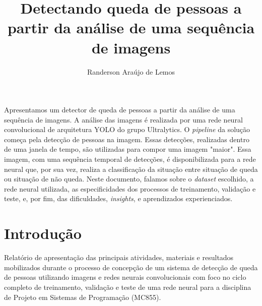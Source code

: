 \documentclass[12pt]{article}
\title{Detectando queda de pessoas a partir da análise de uma sequência de imagens}
\author{Randerson Araújo de Lemos\inst{1}}
\begin{document}
 

\maketitle 

     
\begin{resumo} 
  Apresentamos um detector de queda de pessoas a partir da análise de uma sequência de imagens. A análise das imagens é realizada por uma rede neural convolucional de arquitetura YOLO do grupo Ultralytics. O \textit{pipeline} da solução começa pela detecção de pessoas na imagem. Essas detecções, realizadas dentro de uma janela de tempo, são utilizadas para compor uma imagem "maior". Essa imagem, com uma sequência temporal de detecções, é disponibilizada para a rede neural que, por sua vez, realiza a classificação da situação entre situação de queda ou situação de não queda. Neste documento, falamos sobre o \textit{dataset} escolhido, a rede neural utilizada, as especificidades dos processos de treinamento, validação e teste, e, por fim, das dificuldades, \textit{insights}, e aprendizados experienciados.
\end{resumo}

\section{Introdução}\label{sec:introd}
Relatório de apresentação das principais atividades, materiais e resultados mobilizados durante o processo de concepção de um sistema de detecção de queda de pessoas utilizando imagens e redes neurais convolucionais com foco no ciclo completo de treinamento, validação e teste de uma rede neural para a disciplina de Projeto em Sistemas de Programação (MC855).
\end{document}
